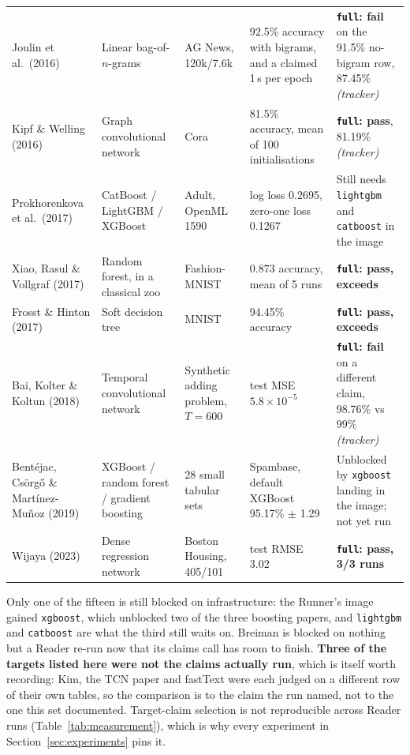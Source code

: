 \documentclass[11pt]{article}
\begin{document}
\begin{table}[tbp]
\begin{tabular}{L{0.165\textwidth}L{0.155\textwidth}L{0.145\textwidth}L{0.225\textwidth}L{0.165\textwidth}}
Joulin et al.\ (2016) \cite{joulin2016fasttext} & Linear bag-of-$n$-grams & AG News,
  120k/7.6k & 92.5\% accuracy with bigrams, and a claimed 1\,s per epoch &
  \textbf{\texttt{full}: fail} on the 91.5\% no-bigram row, 87.45\% \emph{(tracker)} \\
Kipf \& Welling (2016) \cite{kipf2017gcn} & Graph convolutional network & Cora & 81.5\% accuracy,
  mean of 100 initialisations & \textbf{\texttt{full}: pass}, 81.19\% \emph{(tracker)} \\
Prokhorenkova et al.\ (2017) \cite{prokhorenkova2018catboost} & CatBoost / LightGBM / XGBoost &
  Adult, OpenML 1590 & log loss 0.2695, zero-one loss 0.1267 & Still needs \texttt{lightgbm} and
  \texttt{catboost} in the image \\
Xiao, Rasul \& Vollgraf (2017) \cite{xiao2017fashion} & Random forest, in a classical zoo &
  Fashion-MNIST & 0.873 accuracy, mean of 5 runs & \textbf{\texttt{full}: pass, exceeds} \\
Frosst \& Hinton (2017) \cite{frosst2017soft} & Soft decision tree & MNIST & 94.45\% accuracy &
  \textbf{\texttt{full}: pass, exceeds} \\
Bai, Kolter \& Koltun (2018) \cite{bai2018tcn} & Temporal convolutional network & Synthetic adding
  problem, $T = 600$ & test MSE $5.8 \times 10^{-5}$ & \textbf{\texttt{full}: fail} on a different
  claim, 98.76\% vs 99\% \emph{(tracker)} \\
Bentéjac, Csörgő \& Martínez-Muñoz (2019) \cite{bentejac2021comparative} & XGBoost / random forest
  / gradient boosting & 28 small tabular sets & Spambase, default XGBoost 95.17\% $\pm$ 1.29 &
  Unblocked by \texttt{xgboost} landing in the image; not yet run \\
Wijaya (2023) \cite{wijaya2023housing} & Dense regression network & Boston Housing, 405/101 & test
  RMSE 3.02 & \textbf{\texttt{full}: pass, 3/3 runs} \\
\bottomrule
\end{tabular}
\end{table}

Only one of the fifteen is still blocked on infrastructure: the Runner's image gained
\texttt{xgboost}, which unblocked two of the three boosting papers, and \texttt{lightgbm} and
\texttt{catboost} are what the third still waits on. Breiman is blocked on nothing but a Reader
re-run now that its claims call has room to finish. \textbf{Three of the targets listed here were
not the claims actually run}, which is itself worth recording: Kim, the TCN paper and fastText
were each judged on a different row of their own tables, so the comparison is to the claim the
run named, not to the one this set documented. Target-claim selection is not reproducible across
Reader runs (Table~\ref{tab:measurement}), which is why every experiment in
Section~\ref{sec:experiments} pins it.
\end{document}
